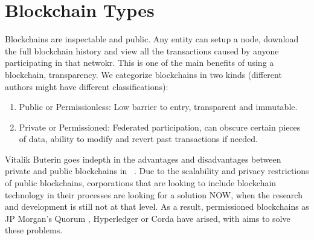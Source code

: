\section{Blockchain Types}
Blockchains are inspectable and public. Any entity can setup a node, download the full blockchain history and view all the transactions caused by anyone participating in that netwokr. This is one of the main benefits of using a blockchain, transparency.
We categorize blockchains in two kinds (different authors might have different classifications):
\begin{enumerate}
    \item Public or Permissionless: Low barrier to entry, transparent and immutable.
    \item Private or Permissioned: Federated participation, can obscure certain pieces of data, ability to modify and revert past transactions if needed.
\end{enumerate}

Vitalik Buterin goes indepth in the advantages and disadvantages between private and public blockchains in ~\cite{publicprivate}. Due to the scalability and privacy restrictions of public blockchains, corporations that are looking to include blockchain technology in their processes are looking for a solution NOW, when the research and development is still not at that level. As a result, permissioned blockchains as JP Morgan's Quorum \cite{quorum}, Hyperledger or Corda have arised, with aims to solve these problems.
